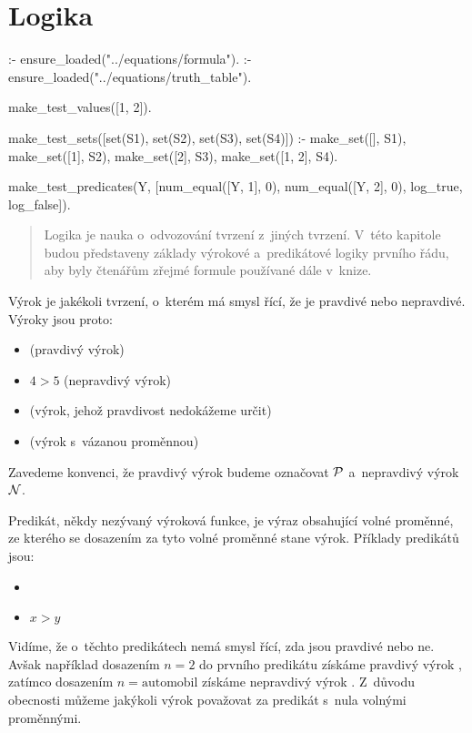 \chapter{Logika}

\begin{prolog}
:- ensure_loaded("../equations/formula").
:- ensure_loaded("../equations/truth_table").

make_test_values([1, 2]).

make_test_sets([set(S1), set(S2), set(S3), set(S4)]) :-
	make_set([], S1),
	make_set([1], S2),
	make_set([2], S3),
	make_set([1, 2], S4).

make_test_predicates(Y, [num_equal([Y, 1], 0), num_equal([Y, 2], 0), log_true, log_false]).
\end{prolog}


\begin{abstract}
Logika je nauka o~odvozování tvrzení z~jiných tvrzení. V~této kapitole budou představeny základy výrokové a~predikátové logiky prvního řádu, aby byly čtenářům zřejmé formule používané dále v~knize.
\end{abstract}

Výrok je jakékoli tvrzení, o~kterém má smysl řící, že je pravdivé nebo nepravdivé. Výroky jsou proto:

\begin{itemize}
	\item {} (pravdivý výrok)
	\item \(4 > 5\) (nepravdivý výrok)
	\item {} (výrok, jehož pravdivost nedokážeme určit)
	\item {} (výrok s~vázanou proměnnou)
\end{itemize}

Zavedeme konvenci, že pravdivý výrok budeme označovat \(\mathcal{P}\) a~nepravdivý výrok \(\mathcal{N}\).

Predikát, někdy nezývaný výroková funkce, je výraz obsahující volné proměnné, ze kterého se dosazením za tyto volné proměnné stane výrok. Příklady predikátů jsou:

\begin{itemize}
	\item {}
	\item \(x > y\)
\end{itemize}

Vidíme, že o~těchto predikátech nemá smysl řící, zda jsou pravdivé nebo ne. Avšak například dosazením \(n = 2\) do prvního predikátu získáme pravdivý výrok , zatímco dosazením \(n = \mathrm{automobil}\) získáme nepravdivý výrok . Z~důvodu obecnosti můžeme jakýkoli výrok považovat za predikát s~nula volnými proměnnými.


